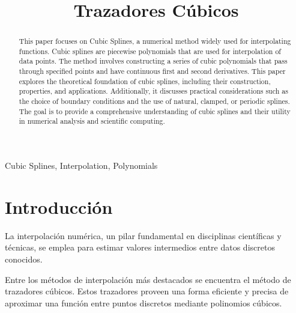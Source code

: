 \documentclass[conference]{IEEEtran}
\begin{document}
\title{Trazadores Cúbicos\\}

\author{
	}

\maketitle



\begin{abstract} This paper focuses on Cubic Splines, a numerical method
	widely used for interpolating functions. Cubic splines are piecewise
	polynomials that are used for interpolation of data points. The method
	involves constructing a series of cubic polynomials that pass through
	specified points and have continuous first and second derivatives. This
	paper explores the theoretical foundation of cubic splines, including
	their construction, properties, and applications. Additionally, it
	discusses practical considerations such as the choice of boundary
	conditions and the use of natural, clamped, or periodic splines. The goal
	is to provide a comprehensive understanding of cubic splines and their
	utility in numerical analysis and scientific computing.
\end{abstract}

\begin{IEEEkeywords}
	Cubic Splines, Interpolation, Polynomials
\end{IEEEkeywords}

\nocite{Trazadores_cúbicos_2014}

\section{Introducción}

La interpolación numérica, un pilar fundamental en disciplinas científicas y
técnicas, se emplea para estimar valores intermedios entre datos discretos
conocidos.

Entre los métodos de interpolación más destacados se encuentra
el método de trazadores cúbicos. Estos trazadores proveen una forma eficiente
y precisa de aproximar una función entre puntos discretos mediante polinomios
cúbicos.
\end{document}
